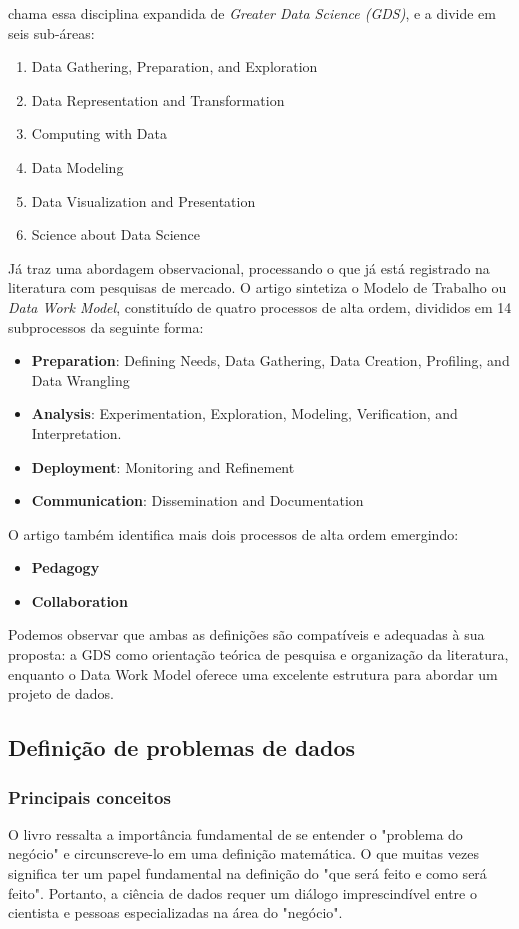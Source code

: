 \documentclass{article}
\begin{document}
\cite{DONOHO} chama essa disciplina expandida de \textit{Greater Data Science (GDS)}, e a divide em seis sub-áreas:
\begin{enumerate}
\item Data Gathering, Preparation, and Exploration
\item Data Representation and Transformation
\item Computing with Data
\item Data Modeling 
\item Data Visualization and Presentation
\item Science about Data Science

\end{enumerate}
Já \cite{BATON} traz uma abordagem observacional, processando o que já está registrado na literatura com pesquisas de mercado. O artigo sintetiza o Modelo de Trabalho ou \emph{Data Work Model}, constituído de quatro processos de alta ordem, divididos em 14 subprocessos da seguinte forma:
\begin{itemize}
\item \textbf{Preparation}: Defining Needs, Data Gathering, Data Creation, Profiling, and Data Wrangling
\item \textbf{Analysis}: Experimentation, Exploration, Modeling, Verification, and Interpretation.
\item \textbf{Deployment}: Monitoring and Refinement
\item \textbf{Communication}: Dissemination and Documentation
\end{itemize}

O artigo também identifica mais dois processos de alta ordem emergindo:
\begin{itemize}
\item \textbf{Pedagogy} 
\item \textbf{Collaboration}
\end{itemize}

Podemos observar que ambas as definições são compatíveis e adequadas à sua proposta: a GDS \cite{DONOHO} como orientação teórica de pesquisa e organização da literatura, enquanto o Data Work Model \cite{BATON} oferece uma excelente estrutura para abordar um projeto de dados. 

\subsection{Definição de problemas de dados}
\subsubsection{Principais conceitos}\label{principais.conceitos}
 O livro \cite{DATAPYTHON} ressalta a importância fundamental de se entender o "problema do negócio" e circunscreve-lo em uma definição matemática. O que muitas vezes significa ter um papel fundamental na definição do "que será feito e como será feito". Portanto, a ciência de dados requer um diálogo imprescindível entre o cientista e pessoas especializadas na área do "negócio".
 
\end{document}
